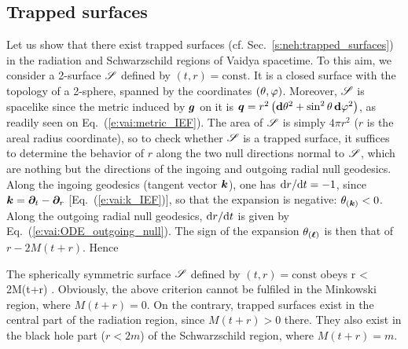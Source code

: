 \subsection{Trapped surfaces} \label{s:vai:trapped_surf}

Let us show that there exist trapped surfaces (cf. Sec.~\ref{s:neh:trapped_surfaces}) in the
radiation and Schwarzschild regions of Vaidya spacetime.
To this aim, we consider a 2-surface $\mathscr{S}$ defined by $(t,r) = \mathrm{const}$. It is a closed surface
with the topology of a 2-sphere, spanned by the coordinates $(\theta,\varphi)$.
Moreover, $\mathscr{S}$ is spacelike since the metric induced by $\bm{g}$ on it  is
$\bm{q} = r^2 \left( \mathbf{d}\theta^2 + \sin^2\theta\, \mathbf{d}\varphi^2 \right) $, as readily seen
on Eq.~(\ref{e:vai:metric_IEF}). The area of $\mathscr{S}$ is simply $4\pi r^2$
($r$ is the areal radius coordinate), so to check whether $\mathscr{S}$ is a trapped surface,
it suffices to determine the behavior
of $r$ along the two null directions normal to $\mathscr{S}$, which are nothing but
the directions of the ingoing and outgoing radial null geodesics.
Along the ingoing geodesics (tangent vector $\bm{k}$),
one has $\mathrm{d} r / \mathrm{d} t = - 1$, since $\bm{k} = \bm{\partial}_t - \bm{\partial}_r$ [Eq.~(\ref{e:vai:k_IEF})],
so that the expansion is negative: $\theta_{(\bm{k})} < 0$.
Along the outgoing radial null geodesics, $\mathrm{d} r / \mathrm{d} t$ is given by Eq.~(\ref{e:vai:ODE_outgoing_null}).
The sign of the expansion $\theta_{(\bm{\ell})}$ is then that of $r - 2M(t+r)$. Hence
\begin{greybox}
The spherically symmetric surface $\mathscr{S}$ defined by $(t,r) = \mathrm{const}$ obeys
\be \label{e:vai:S_trapped}
    \Sp {} \iff r < 2M(t+r) .
\ee
Obviously, the above criterion cannot be fulfiled in the Minkowski region, where $M(t+r) = 0$.
On the contrary, trapped surfaces exist
in the central part of the radiation region, since $M(t+r) > 0$ there.
They also exist in the black hole part ($r < 2m$)
of the Schwarzschild region, where
$M(t+r) = m$.
\end{greybox}

